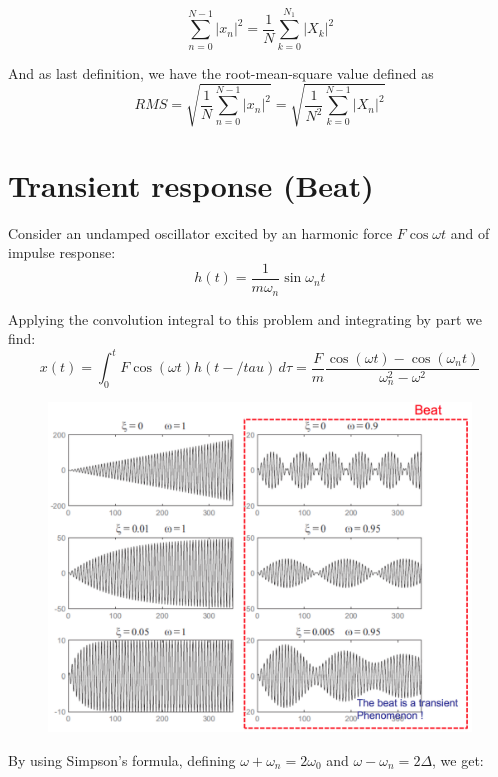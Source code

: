 			\begin{equation}
			\sum _{n=0}^{N-1}|x_n|^2 = \frac{1}{N} \sum _{k=0}^{N_1} |X_k|^2
			\end{equation}
			
			And as last definition, we have the root-mean-square value defined as 
			\begin{equation}
			RMS = \sqrt{\frac{1}{N}\sum _{n=0}^{N-1}|x_n|^2} = \sqrt{\frac{1}{N^2}\sum _{k=0}^{N-1}|X_n|^2}
			\end{equation}
			
			\section{Transient response (Beat)}
				Consider an undamped oscillator excited by an harmonic force $F\cos \omega t$ and of impulse response:
				\begin{equation}
				h(t) = \frac{1}{m\omega _n} \sin \omega _nt 
 				\end{equation}
 				
 				Applying the convolution integral to this problem and integrating by part we find:
 				\begin{equation}
 				x(t) = \int _0 ^t F\cos (\omega t) h(t-/tau ) \, d\tau = \frac{F}{m} \frac{\cos (\omega t) - \cos (\omega _n t)}{\omega _n ^2 - \omega ^2} 
 				\end{equation}
 				
 				\begin{figure}
				\vspace{-5mm}
				\includegraphics[scale=0.3]{ch1/12}
				\end{figure}
				By using Simpson's formula, defining $\omega + \omega _n = 2\omega _0$ and $\omega - \omega _n = 2\Delta$, we get:
 				

